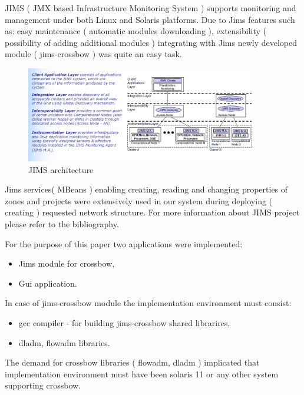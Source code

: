 \documentclass[11pt]{book}
\begin{document}
		JIMS ( JMX based Infrastructure Monitoring System ) supports monitoring and management under both Linux and Solaris platforms. 
		Due to Jims features such as: easy maintenance ( automatic modules downloading ), extensibility ( possibility of adding additional modules ) integrating 
		with Jims newly	developed module ( jims-crossbow ) was quite an easy task. \cite{jims}
	
		\begin{figure}[H]
          \begin{center}
            \includegraphics[width=0.9\textwidth]{img/jims/jims.png}
          \end{center}
          \caption{JIMS architecture \cite{jims}}
		\end{figure}
	 
		Jims services( MBeans ) enabling creating, reading and changing properties of zones and projects were extensively used in our system
		during deploying ( creating ) requested network structure. For more information about JIMS project please refer to the bibliography.	
	
		\medskip
	
		For the purpose of this paper two applications were implemented:
	
		\begin{itemize}
			\item{Jims module for crossbow,}
			\item{Gui application.}
		\end{itemize}
	
		\medskip
	
		In case of jims-crossbow module the implementation environment must consist:
		\begin{itemize}
			\item{gcc compiler - for building jims-crossbow shared librarires,}
			\item{dladm, flowadm libraries.}
		\end{itemize}
	
		The demand for crossbow libraries ( flowadm, dladm ) implicated that implementation environment must have been solaris 11 
		or any other system supporting crossbow.
	
\end{document}
